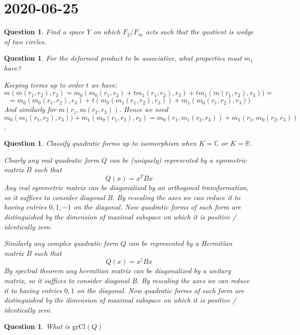 \documentclass[a4paper]{article}
\newtheorem{que}[thm]{Question}
\begin{document}
\section*{ 2020-06-25}

\begin{que} Find a space $Y$ on which $F_2/F_\infty$ acts such that the quotient is wedge of two circles.

\end{que} 
\begin{que} For the deformed product to be associative, what properties must $m_1$ have?
	
	Keeping terms up to order $t$ we have:
	$$m(m(r_1, r_2), r_3) = m_0(m_0(r_1, r_2) + t m_1(r_1,r_2), r_3) + t m_1(m(r_1, r_2), r_3)) = $$
	$$ = m_0(m_0(r_1, r_2), r_3) + t (m_0(m_1(r_1, r_2), r_3)) +  m_1(m_0(r_1, r_2), r_3))$$
	And similarly for $m(r_1, m(r_2, r_3))$. Hence we need 
	$$m_0(m_1(r_1, r_2), r_3)) +  m_1(m_0(r_1, r_2), r_3) = m_0(r_1, m_1(r_2, r_3)) +  m_1(r_1, m_0(r_2, r_3))$$.
\end{que}
\begin{que} Classify quadratic forms up to isomorphism when $K = \mathbb{C}$ or $K = \mathbb{R}$. 
	
	
	Clearly any real quadratic form $Q$ can be (uniquely) represented by a symmetric matrix $B$ such that
	$$Q(x) = x^T B x$$
	Any real symmetric matrix can be diagonalized by an orthogonal transformation, so it suffices to consider diagonal B. By rescaling the axes we can reduce it to having entries $0, 1, -1$ on the diagonal. Now quadratic forms of such form are distinguished by the dimension of maximal subspace on which it is positive / identically zero.
	
	Similarly any complex quadratic form $Q$ can be represented by a Hermitian matrix $B$ such that 
	$$Q(x) = x^\dag B x$$
	By spectral theorem any hermitian matrix can be diagonalized by a unitary matrix, so it suffices to consider diagonal B.
	By rescaling the axes we can reduce it to having entries $0, 1$ on the diagonal. Now quadratic forms of such form are distinguished by the dimension of maximal subspace on which it is positive / identically zero.
\end{que}
\begin{que} What is $\text{gr}  \text{Cl}(Q)$
\end{que}
\end{document}
